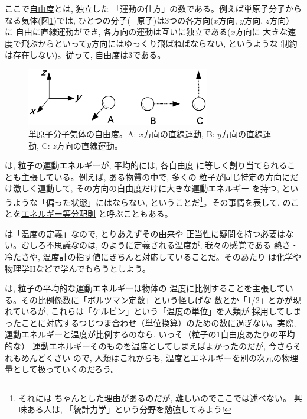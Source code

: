 ここで\underline{自由度}とは, 独立した
「運動の仕方」の数である。例えば単原子分子からなる気体(図\ref{fig:deg_freedom1})では, 
ひとつの分子(=原子)は3つの各方向($x$方向, $y$方向, $z$方向）に
自由に直線運動ができ, 各方向の運動は互いに独立である($x$方向に
大きな速度で飛ぶからといって$y$方向にはゆっくり飛ばねばならない, というような
制約は存在しない)。従って, 自由度は3である。

\begin{figure}[h]
    \centering
    \includegraphics[width=8cm]{deg_freedom1.eps}
    \caption{単原子分子気体の自由度。A: $x$方向の直線運動, B: $y$方向の直線運動, C: $z$方向の直線運動。}\label{fig:deg_freedom1}
\end{figure}

は, 粒子の運動エネルギーが, 平均的には, 各自由度
に等しく割り当てられることも主張している。例えば, ある物質の中で, 多くの
粒子が同じ特定の方向にだけ激しく運動して, その方向の自由度だけに大きな運動エネルギー
を持つ, というような「偏った状態」にはならない, ということだ\footnote{それには
ちゃんとした理由があるのだが, 難しいのでここでは述べない。
興味ある人は, 「統計力学」という分野を勉強してみよう!}。その事情を表して, 
のことを\underline{エネルギー等分配則}
と呼ぶこともある。\mv

は「温度の定義」なので, とりあえずその由来や
正当性に疑問を持つ必要はない。むしろ不思議なのは, 
のように定義される温度が, 我々の感覚である
熱さ・冷たさや, 温度計の指す値にきちんと対応していることだ。そのあたり
は化学や物理学IIなどで学んでもらうとしよう。

は, 粒子の平均的な運動エネルギーは物体の
温度に比例することを主張している。その比例係数に「ボルツマン定数」という怪しげな
数とか「1/2」とかが現れているが, これらは「ケルビン」という「温度の単位」を人類が
採用してしまったことに対応するつじつま合わせ（単位換算）のための数に過ぎない。実際, 
運動エネルギーと温度が比例するのなら, いっそ（粒子の1自由度あたりの平均的な）
運動エネルギーそのものを温度としてしまえばよかったのだが, 今さらそれもめんどくさい
ので, 人類はこれからも, 温度とエネルギーを別の次元の物理量として扱っていくのだろう。\mv

